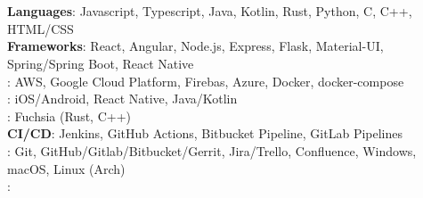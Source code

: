 \documentclass[letterpaper,11pt]{article}
\begin{document}
\section{}
\begin{itemize}[leftmargin=0.15in, label={}]
\small{\item{
\textbf{Languages}{: Javascript, Typescript, Java, Kotlin, Rust, Python, C, C++, HTML/CSS} \\
\textbf{Frameworks}{: React, Angular, Node.js, Express, Flask, Material-UI, Spring/Spring Boot, React Native} \\
\textbf{}{: AWS, Google Cloud Platform, Firebas, Azure, Docker, docker-compose} \\
\textbf{}{: iOS/Android, React Native, Java/Kotlin} \\
\textbf{}{: Fuchsia (Rust, C++)} \\
\textbf{CI/CD}{: Jenkins, GitHub Actions, Bitbucket Pipeline, GitLab Pipelines} \\
\textbf{}{: Git, GitHub/Gitlab/Bitbucket/Gerrit, Jira/Trello, Confluence, Windows, macOS, Linux (Arch)} \\
\textbf{}{: }
}}
\end{itemize}


\end{document}
